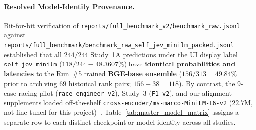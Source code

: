 \documentclass[11pt,a4paper]{article}
\begin{document}
\paragraph{Resolved Model-Identity Provenance.}
Bit-for-bit verification of \nolinkurl{reports/full_benchmark_v2/benchmark_raw.jsonl} against \nolinkurl{reports/full_benchmark/benchmark_raw_self_jev_minilm_packed.jsonl} established that all $244/244$ Study~1A predictions under the UI display label \texttt{self-jev-minilm} ($118/244 = 48.3607\%$) have \textbf{identical probabilities and latencies} to the Run~\#5 trained \textbf{BGE-base ensemble} ($156/313 = 49.84\%$ prior to archiving $69$ historical rank pairs; $156-38=118$). By contrast, the 9-case racing pilot (\texttt{race\_engineer\_v2}), Study~3 (\texttt{F1 v2}), and our alignment supplements loaded off-the-shelf \nolinkurl{cross-encoder/ms-marco-MiniLM-L6-v2} ($22.7$M, not fine-tuned for this project)~\cite{minilm_card}. Table~\ref{tab:master_model_matrix} assigns a separate row to each distinct checkpoint or model identity across all studies.
\end{document}
